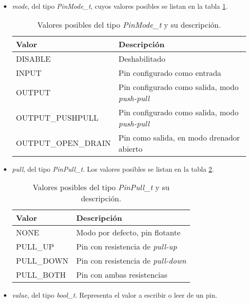 \begin{itemize}
\item
\emph{mode}, del tipo \emph{PinMode\_t}, cuyos valores posibles se listan en la tabla \ref{tab:PinModeT}.


\begin{table}[h]
	\centering	
	\begin{tabular}{l l}   
		\toprule
		\textbf{Valor} 	    & \textbf{Descripción}  \\
		\midrule
		DISABLE	 & Deshabilitado \\		
		INPUT	    & Pin configurado como entrada	\\
		OUTPUT	 & Pin configurado como salida, modo \emph{push-pull}	\\
		OUTPUT\_PUSHPULL & Pin configurado como salida, modo \emph{push-pull}	\\
		OUTPUT\_OPEN\_DRAIN	 & Pin como salida, en modo drenador abierto	\\
		\bottomrule
		\hline
	\end{tabular}
	\caption[Valores posibles del tipo \emph{PinMode\_t}.]{Valores posibles del tipo \emph{PinMode\_t} y su descripción.}
	\label{tab:PinModeT}
\end{table}

\item
\emph{pull}, del tipo \emph{PinPull\_t}. Los valores posibles se listan en la tabla \ref{tab:PullT}.


\begin{table}[h]
	\centering	
	\begin{tabular}{l l}   
		\toprule
		\textbf{Valor} 	    & \textbf{Descripción} \\
		\midrule
		NONE	       & Modo por defecto, pin flotante \\		
		PULL\_UP	    & Pin con resistencia de \emph{pull-up} \\
		PULL\_DOWN	 & Pin con resistencia de \emph{pull-down} \\
		PULL\_BOTH	 & Pin con ambas resistencias \\
		\bottomrule
		\hline
	\end{tabular}
	\caption[Valores posibles del tipo \emph{PinPull\_t}.]{Valores posibles del tipo \emph{PinPull\_t} y su descripción.}
	\label{tab:PullT}
\end{table}

\item
\emph{value}, del tipo \emph{bool\_t}. Representa el valor a escribir o leer de un pin.
\end{itemize}

